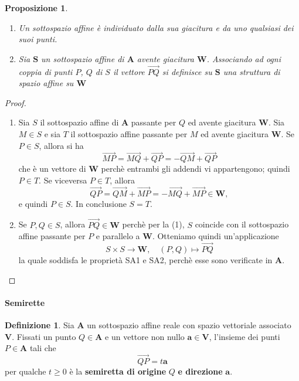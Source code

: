 \documentclass{article}
\theoremstyle{plain}
\newtheorem{prop}[thm]{Proposizione}
\theoremstyle{definition}
\newtheorem{defn}{Definizione}[section]
\theoremstyle{remark}
\begin{document}
\vspace{10pt}

\begin{bxthm}
\begin{prop}\hfill    
    \begin{enumerate}
        \item Un sottospazio affine è individuato dalla sua giacitura e da uno qualsiasi dei suoi punti.
        \item Sia $\mathbf{S}$ un sottospazio affine di $\mathbf{A}$ avente giacitura $\mathbf{W}$. Associando ad ogni coppia di punti $P$, $Q$ di $S$ il vettore $\overrightarrow{PQ}$ si definisce su $\mathbf{S}$ una struttura di spazio affine su $\mathbf{W}$
    \end{enumerate}    
\end{prop}
\end{bxthm}
\begin{proof}\hfill
    \begin{enumerate}
        \item Sia $S$ il sottospazio affine di $\mathbf{A}$ passante per $Q$ ed avente giacitura $\mathbf{W}$. Sia $M\in S$ e sia $T$ il sottospazio 
        affine passante per $M$ ed avente giacitura $\mathbf{W}$. Se $P\in S$, allora si ha
        \[\overrightarrow{MP}=\overrightarrow{MQ}+\overrightarrow{QP}=-\overrightarrow{QM}+\overrightarrow{QP}\]
        che è un vettore di $\mathbf{W}$ perchè entrambi gli addendi vi appartengono; quindi $P\in T$. 
        Se viceversa $P\in T$, allora 
        \[\overrightarrow{QP}=\overrightarrow{QM}+\overrightarrow{MP}=-\overrightarrow{MQ}+\overrightarrow{MP}\in \mathbf{W},\] e quindi
        $P\in S$. In conclusione $S=T$.
        \item Se $P,Q\in S$, allora $\overrightarrow{PQ}\in\mathbf{W}$ perchè per la (1), $S$ coincide con il sottospazio affine passante per $P$ e parallelo a $\mathbf{W}$. 
        Otteniamo quindi un'applicazione \[S\times S\to\mathbf{W},\quad(P,Q)\mapsto\overrightarrow{PQ}\]la quale soddisfa le proprietà 
        SA1 e SA2, perchè esse sono verificate in $\mathbf{A}$.
    \end{enumerate}
\end{proof}

\vspace{10pt}

\paragraph{Semirette}
\begin{bxthm}
\begin{defn}
    Sia $\mathbf{A}$ un sottospazio affine reale con spazio vettoriale associato $\mathbf{V}$. Fissati un punto $Q\in\mathbf{A}$ e un vettore non nullo $\mathbf{a}\in\mathbf{V}$, 
    l'insieme dei punti $P\in\mathbf{A}$ tali che \[\overrightarrow{QP}=t\mathbf{a}\] per qualche $t\geq0$ è la \textbf{semiretta di origine} $Q$ \textbf{e direzione} $\mathbf{a}$.
\end{defn}
\end{bxthm}
\end{document}
